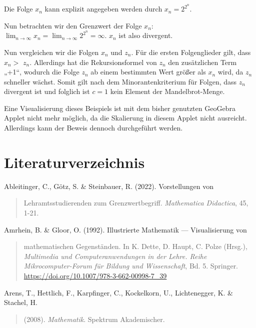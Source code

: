 \documentclass[a4paper, 12pt]{book}
\begin{document}
Die Folge \(x_{n}\) kann explizit angegeben werden durch
\(x_{n} = 2^{2^{n}}\).

Nun betrachten wir den Grenzwert der Folge \(x_{n}\):
\(\lim_{n \rightarrow \infty}x_{n} = \lim_{n \rightarrow \infty}2^{2^{n}} = \infty\).
\(x_{n}\) ist also divergent.

Nun vergleichen wir die Folgen \(x_{n}\) und \(z_{n}\). Für die ersten
Folgenglieder gilt, dass \(x_{n} > \) \(z_{n}\). Allerdings hat die
Rekursionsformel von \(z_{n}\) den zusätzlichen Term „+1``, wodurch die
Folge \(z_{n}\) ab einem bestimmten Wert größer als \(x_{n}\) wird, da
\(z_{n}\) schneller wächst. Somit gilt nach dem Minorantenkriterium für
Folgen, dass \(z_{n}\) divergent ist und folglich ist \(c = 1\) kein
Element der Mandelbrot-Menge. \hfill\blacksquare

Eine Visualisierung dieses Beispiels ist mit dem bisher genutzten
GeoGebra Applet nicht mehr möglich, da die Skalierung in diesem Applet
nicht ausreicht. Allerdings kann der Beweis dennoch durchgeführt werden.


\chapter{Literaturverzeichnis}\label{literaturverzeichnis}

Ableitinger, C., Götz, S. \& Steinbauer, R. (2022). Vorstellungen von

\begin{quote}
Lehramtsstudierenden zum Grenzwertbegriff. \emph{Mathematica Didactica},
45, 1-21.
\end{quote}

Amrhein, B. \& Gloor, O. (1992). Illustrierte Mathematik ---
Visualisierung von

\begin{quote}
mathematischen Gegenständen. In K. Dette, D. Haupt, C. Polze (Hrsg.),
\emph{Multimedia und Computeranwendungen in der Lehre. Reihe
Mikrocomputer-Forum für Bildung und Wissenschaft}, Bd. 5. Springer.
\url{https://doi.org/10.1007/978-3-662-00998-7_39}
\end{quote}

Arens, T., Hettlich, F., Karpfinger, C., Kockelkorn, U., Lichtenegger,
K. \& Stachel, H.

\begin{quote}
(2008). \emph{Mathematik}. Spektrum Akademischer.
\end{quote}
\end{document}
